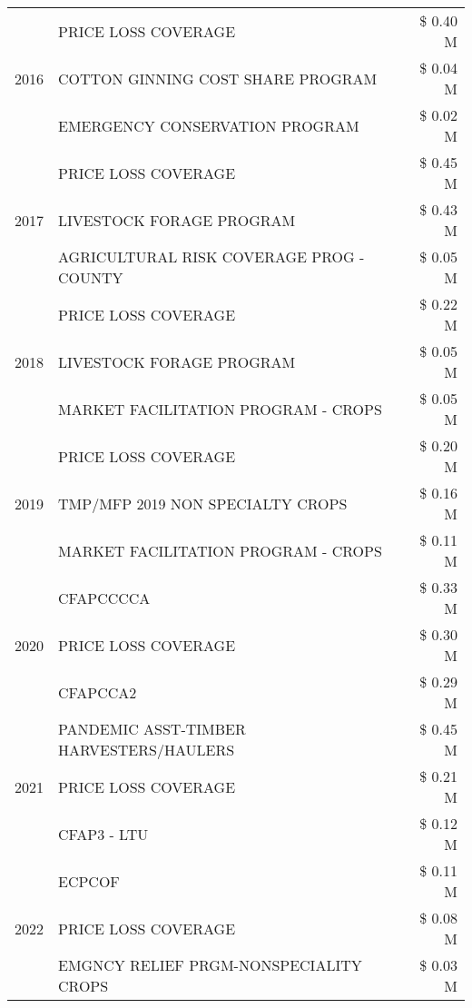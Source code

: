\begin{tabular}{llr}
\multirow[t]{3}{*}{2016} & PRICE LOSS COVERAGE & \$ 0.40 M \\
 & COTTON GINNING COST SHARE PROGRAM & \$ 0.04 M \\
 & EMERGENCY CONSERVATION PROGRAM & \$ 0.02 M \\
\cline{1-3}
\multirow[t]{3}{*}{2017} & PRICE LOSS COVERAGE & \$ 0.45 M \\
 & LIVESTOCK FORAGE PROGRAM & \$ 0.43 M \\
 & AGRICULTURAL RISK COVERAGE PROG - COUNTY & \$ 0.05 M \\
\cline{1-3}
\multirow[t]{3}{*}{2018} & PRICE LOSS COVERAGE & \$ 0.22 M \\
 & LIVESTOCK FORAGE PROGRAM & \$ 0.05 M \\
 & MARKET FACILITATION PROGRAM - CROPS & \$ 0.05 M \\
\cline{1-3}
\multirow[t]{3}{*}{2019} & PRICE LOSS COVERAGE & \$ 0.20 M \\
 & TMP/MFP 2019 NON SPECIALTY CROPS & \$ 0.16 M \\
 & MARKET FACILITATION PROGRAM - CROPS & \$ 0.11 M \\
\cline{1-3}
\multirow[t]{3}{*}{2020} & CFAPCCCCA & \$ 0.33 M \\
 & PRICE LOSS COVERAGE & \$ 0.30 M \\
 & CFAPCCA2 & \$ 0.29 M \\
\cline{1-3}
\multirow[t]{3}{*}{2021} & PANDEMIC ASST-TIMBER HARVESTERS/HAULERS & \$ 0.45 M \\
 & PRICE LOSS COVERAGE & \$ 0.21 M \\
 & CFAP3 - LTU & \$ 0.12 M \\
\cline{1-3}
\multirow[t]{3}{*}{2022} & ECPCOF & \$ 0.11 M \\
 & PRICE LOSS COVERAGE & \$ 0.08 M \\
 & EMGNCY RELIEF PRGM-NONSPECIALITY CROPS & \$ 0.03 M \\
\cline{1-3}
\bottomrule
\end{tabular}
